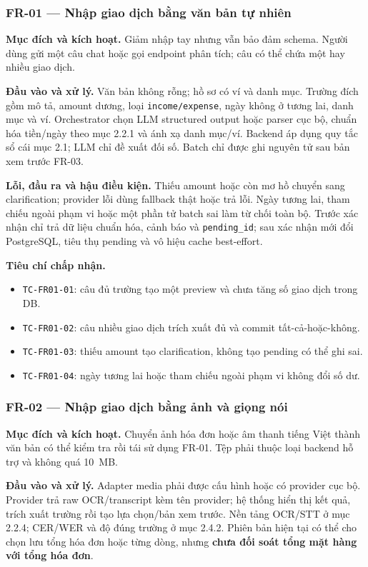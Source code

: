 \subsubsection{FR-01 --- Nhập giao dịch bằng văn bản tự nhiên}

\textbf{Mục đích và kích hoạt.} Giảm nhập tay nhưng vẫn bảo đảm schema. Người dùng gửi một câu chat hoặc gọi endpoint phân tích; câu có thể chứa một hay nhiều giao dịch.

\textbf{Đầu vào và xử lý.} Văn bản không rỗng; hồ sơ có ví và danh mục. Trường đích gồm mô tả, amount dương, loại \texttt{income/expense}, ngày không ở tương lai, danh mục và ví. Orchestrator chọn LLM structured output hoặc parser cục bộ, chuẩn hóa tiền/ngày theo mục 2.2.1 và ánh xạ danh mục/ví. Backend áp dụng quy tắc sổ cái mục 2.1; LLM chỉ đề xuất đối số. Batch chỉ được ghi nguyên tử sau bản xem trước FR-03.

\textbf{Lỗi, đầu ra và hậu điều kiện.} Thiếu amount hoặc còn mơ hồ chuyển sang clarification; provider lỗi dùng fallback thật hoặc trả lỗi. Ngày tương lai, tham chiếu ngoài phạm vi hoặc một phần tử batch sai làm từ chối toàn bộ. Trước xác nhận chỉ trả dữ liệu chuẩn hóa, cảnh báo và \texttt{pending\_id}; sau xác nhận mới đổi PostgreSQL, tiêu thụ pending và vô hiệu cache best-effort.

\textbf{Tiêu chí chấp nhận.}
\begin{itemize}
  \item \texttt{TC-FR01-01}: câu đủ trường tạo một preview và chưa tăng số giao dịch trong DB.
  \item \texttt{TC-FR01-02}: câu nhiều giao dịch trích xuất đủ và commit tất-cả-hoặc-không.
  \item \texttt{TC-FR01-03}: thiếu amount tạo clarification, không tạo pending có thể ghi sai.
  \item \texttt{TC-FR01-04}: ngày tương lai hoặc tham chiếu ngoài phạm vi không đổi số dư.
\end{itemize}

\subsubsection{FR-02 --- Nhập giao dịch bằng ảnh và giọng nói}

\textbf{Mục đích và kích hoạt.} Chuyển ảnh hóa đơn hoặc âm thanh tiếng Việt thành văn bản có thể kiểm tra rồi tái sử dụng FR-01. Tệp phải thuộc loại backend hỗ trợ và không quá 10~MB.

\textbf{Đầu vào và xử lý.} Adapter media phải được cấu hình hoặc có provider cục bộ. Provider trả raw OCR/transcript kèm tên provider; hệ thống hiển thị kết quả, trích xuất trường rồi tạo lựa chọn/bản xem trước. Nền tảng OCR/STT ở mục 2.2.4; CER/WER và độ đúng trường ở mục 2.4.2. Phiên bản hiện tại có thể cho chọn lưu tổng hóa đơn hoặc từng dòng, nhưng \textbf{chưa đối soát tổng mặt hàng với tổng hóa đơn}.

